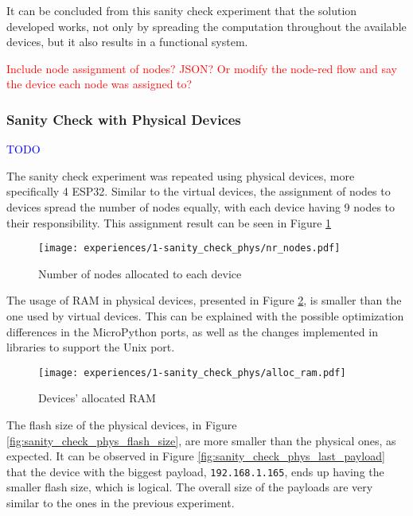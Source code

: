 It can be concluded from this sanity check experiment that the solution developed works, not only by spreading the computation throughout the available devices, but it also results in a functional system.

\textcolor{red}{Include node assignment of nodes? JSON? Or modify the node-red flow and say the device each node was assigned to?}


\subsubsection{Sanity Check with Physical Devices}

\textcolor{blue}{TODO}

The sanity check experiment was repeated using physical devices, more specifically 4 ESP32. Similar to the virtual devices, the assignment of nodes to devices spread the number of nodes equally, with each device having 9 nodes to their responsibility. This assignment result can be seen in Figure \ref{fig:sanity_check_phys_nr_nodes}

\begin{figure}[h]
\centering
\texttt{[image: experiences/1-sanity\_check\_phys/nr\_nodes.pdf]}
\caption[Number of nodes allocated to each device]{Number of nodes allocated to each device}\label{fig:sanity_check_phys_nr_nodes}
\end{figure}

The usage of RAM in physical devices, presented in Figure \ref{fig:sanity_check_phys_alloc_ram}, is smaller than the one used by virtual devices. This can be explained with the possible optimization differences in the MicroPython ports, as well as the changes implemented in libraries to support the Unix port.
    
\begin{figure}[h]
\centering
\texttt{[image: experiences/1-sanity\_check\_phys/alloc\_ram.pdf]}
\caption[Devices' allocated RAM]{Devices' allocated RAM}\label{fig:sanity_check_phys_alloc_ram}
\end{figure}

The flash size  of the physical devices, in Figure \ref{fig:sanity_check_phys_flash_size}, are more smaller than the physical ones, as expected. It can be observed in Figure \ref{fig:sanity_check_phys_last_payload} that the device with the biggest payload, \texttt{192.168.1.165}, ends up having the smaller flash size, which is logical. The overall size of the payloads are very similar to the ones in the previous experiment. 

